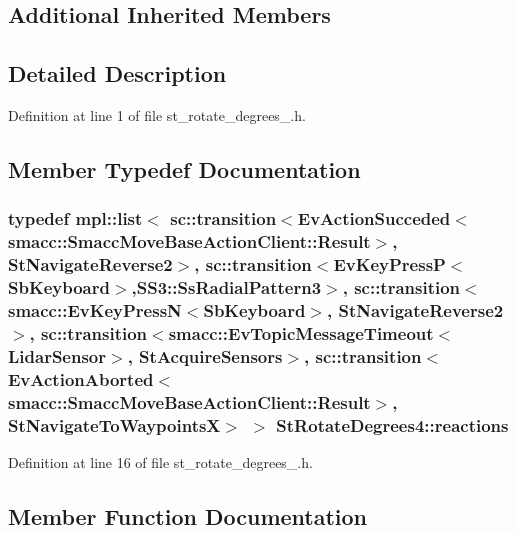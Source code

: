 \subsection*{Additional Inherited Members}


\subsection{Detailed Description}


Definition at line 1 of file st\+\_\+rotate\+\_\+degrees\+\_.\+h.



\subsection{Member Typedef Documentation}
\subsubsection[{\texorpdfstring{reactions}{reactions}}]{\setlength{\rightskip}{0pt plus 5cm}typedef mpl\+::list$<$ sc\+::transition$<$Ev\+Action\+Succeded$<$smacc\+::\+Smacc\+Move\+Base\+Action\+Client\+::\+Result$>$, {\bf St\+Navigate\+Reverse2}$>$, sc\+::transition$<$Ev\+Key\+PressP$<$Sb\+Keyboard$>$,{\bf S\+S3\+::\+Ss\+Radial\+Pattern3}$>$, sc\+::transition$<${\bf smacc\+::\+Ev\+Key\+PressN}$<$Sb\+Keyboard$>$, {\bf St\+Navigate\+Reverse2}$>$, sc\+::transition$<${\bf smacc\+::\+Ev\+Topic\+Message\+Timeout}$<${\bf Lidar\+Sensor}$>$, {\bf St\+Acquire\+Sensors}$>$, sc\+::transition$<$Ev\+Action\+Aborted$<$smacc\+::\+Smacc\+Move\+Base\+Action\+Client\+::\+Result$>$, {\bf St\+Navigate\+To\+WaypointsX}$>$ $>$ {\bf St\+Rotate\+Degrees4\+::reactions}}\hypertarget{structStRotateDegrees4_a506bf7076b8efde58968fbe6782d259c}{}\label{structStRotateDegrees4_a506bf7076b8efde58968fbe6782d259c}


Definition at line 16 of file st\+\_\+rotate\+\_\+degrees\+\_.\+h.



\subsection{Member Function Documentation}
